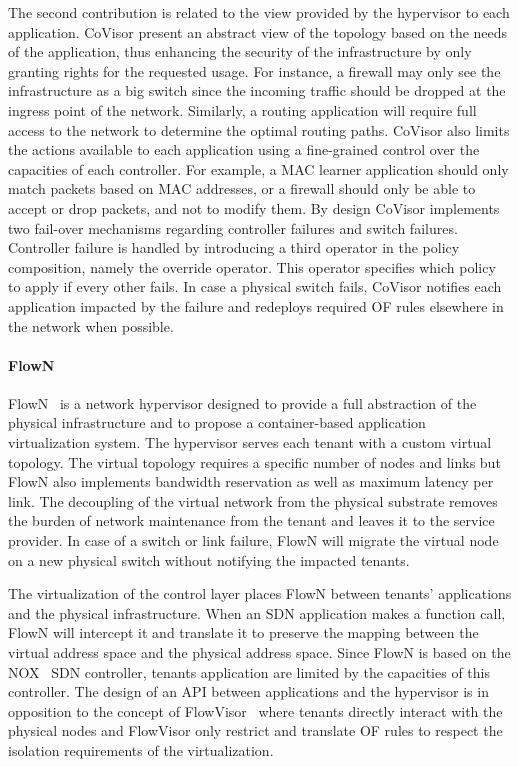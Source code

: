 The second contribution is related to the view provided by the hypervisor to each application.
CoVisor present an abstract view of the topology based on the needs of the application, thus enhancing the security of the infrastructure by only granting rights for the requested usage. 
For instance, a firewall may only see the infrastructure as a big switch since the incoming traffic should be dropped at the ingress point of the network.
Similarly, a routing application will require full access to the network to determine the optimal routing paths.
CoVisor also limits the actions available to each application using a fine-grained control over the capacities of each controller.
For example, a MAC learner application should only match packets based on MAC addresses, or a firewall should only be able to accept or drop packets, and not to modify them.
By design CoVisor implements two fail-over mechanisms regarding controller failures and switch failures.
Controller failure is handled by introducing a third operator in the policy composition, namely the override operator. This operator specifies which policy to apply if every other fails.
In case a physical switch fails, CoVisor notifies each application impacted by the failure and redeploys required OF rules elsewhere in the network when possible.


\paragraph{FlowN}
FlowN~\cite{FlowN-Drutskoy2012} is a network hypervisor designed to provide a full abstraction of the physical infrastructure and to propose a container-based application virtualization system. 
The hypervisor serves each tenant with a custom virtual topology. The virtual topology requires a specific number of nodes and links but FlowN also implements bandwidth reservation as well as maximum latency per link. The decoupling of the virtual network from the physical substrate removes the burden of network maintenance from the tenant and leaves it to the service provider. In case of a switch or link failure, FlowN will migrate the virtual node on a new physical switch without notifying the impacted tenants.

The virtualization of the control layer places FlowN between tenants' applications and the physical infrastructure. When an SDN application makes a function call, FlowN will intercept it and translate it to preserve the mapping between the virtual address space and the physical address space. Since FlowN is based on the NOX~\cite{nox-gude2008} SDN controller, tenants application are limited by the capacities of this controller. 
The design of an API between applications and the hypervisor is in opposition to the concept of FlowVisor~\cite{FlowVisor-Sherwood2009} where tenants directly interact with the physical nodes and FlowVisor only restrict and translate OF rules to respect the isolation requirements of the virtualization.

